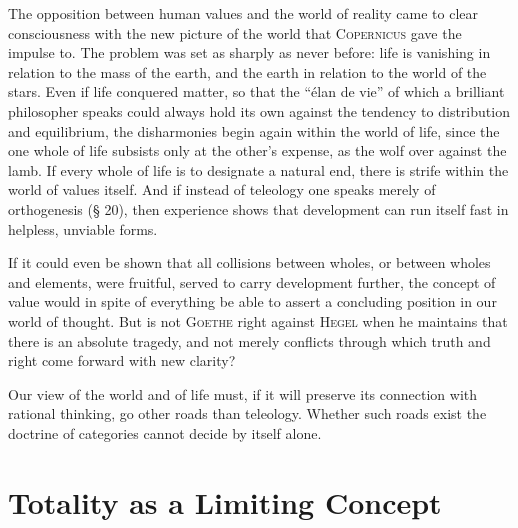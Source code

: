 \documentclass[12pt]{book}
\begin{document}
The opposition between human values and the world of reality came to clear consciousness
with the new picture of the world that \textsc{Copernicus} gave the impulse to. The problem
was set as sharply as never before: life is vanishing in relation to the mass of the earth,
and the earth in relation to the world of the stars. Even if life conquered matter, so that
the ``élan de vie'' of which a brilliant philosopher speaks could always hold its own
against the tendency to distribution and equilibrium, the disharmonies begin again within
the world of life, since the one whole of life subsists only at the other's expense, as the
wolf over against the lamb. If every whole of life is to designate a natural end, there is
strife within the world of values itself. And if instead of teleology one speaks merely of
orthogenesis (§ 20), then experience shows that development can run itself fast in helpless,
unviable forms.

If it could even be shown that all collisions between wholes, or between wholes and
elements, were fruitful, served to carry development further, the concept of value would in
spite of everything be able to assert a concluding position in our world of thought. But is
not \textsc{Goethe} right against \textsc{Hegel} when he maintains that there is an absolute
tragedy, and not merely conflicts through which truth and right come forward with new
clarity?

Our view of the world and of life must, if it will preserve its connection with rational
thinking, go other roads than teleology. Whether such roads exist the doctrine of categories
cannot decide by itself alone.



\chapter{Totality as a Limiting Concept}
\label{ch:6}
\end{document}
